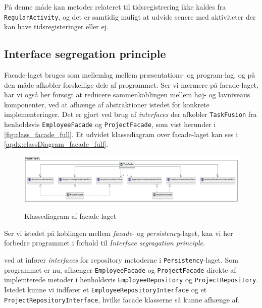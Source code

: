 På denne måde kan metoder relateret til tidsregistrering ikke kaldes fra \texttt{RegularActivity}, og det er samtidig muligt at udvide senere med aktiviteter der kan have tidsregisteringer eller ej.

\subsection{Interface segregation principle} \label{sec:solid_i}
Facade-laget bruges som mellemlag mellem præsentations- og program-lag, og på den måde afkobler forskellige dele af programmet. Ser vi nærmere på facade-laget, har vi også her forsøgt at reducere sammenkoblingen mellem høj- og lavniveaus komponenter, ved at afhænge af abstraktioner istedet for konkrete implementeringer. Det er gjort ved brug af \textit{interfaces} der afkobler \texttt{TaskFusion} fra henholdsvis \texttt{EmployeeFacade} og \texttt{ProjectFacade}, som vist herunder i \ref{fig:class_facade_full}. Et udvidet klassediagram over facade-laget kan ses i \ref{apdx:classDiagram_facade_full}.

\begin{figure}[H]
    \centering
    \caption{Klassediagram af facade-laget}
    \includegraphics[width = \textwidth, keepaspectratio]{TaskFusion/out/assets/diagrams/class_facade_layer_simple/ClassDiagram_facade_simple.png}
    \label{fig:class_facade_simple}
\end{figure}

Ser vi istedet på koblingen mellem \textit{facade}- og \textit{persistency}-laget, kan vi her forbedre programmet i forhold til \textit{Interface segragation principle}.

ved at infører \textit{interfaces} for repository metoderne i \texttt{Persistency}-laget. Som programmet er nu, afhænger \texttt{EmployeeFacade} og \texttt{ProjectFacade} direkte af implemterede metoder i henholdsvis \texttt{EmployeeRepository} og \texttt{ProjectRepository}. Istedet kunne vi indfører et \texttt{EmployeeRepositoryInterface} og et \texttt{ProjectRepositoryInterface}, hvilke facade klasserne så kunne afhænge af. 

